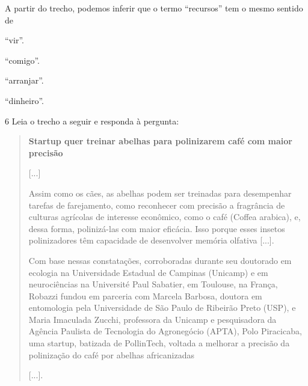 A partir do trecho, podemos inferir que o termo ``recursos'' tem o mesmo
sentido de

\begin{escolha}
\item ``vir''.

\item ``comigo''.

\item ``arranjar''.

\item ``dinheiro''.
\end{escolha}


\num{6} Leia o trecho a seguir e responda à pergunta:

\begin{quote}
\textbf{Startup quer treinar abelhas para polinizarem café com maior precisão}

{[}...{]}

Assim como os cães, as abelhas podem ser treinadas para desempenhar
tarefas de farejamento, como reconhecer com precisão a fragrância de
culturas agrícolas de interesse econômico, como o café (Coffea arabica),
e, dessa forma, polinizá-las com maior eficácia. Isso porque esses
insetos polinizadores têm capacidade de desenvolver memória olfativa
{[}...{]}.

Com base nessas constatações, corroboradas durante seu doutorado em
ecologia na Universidade Estadual de Campinas (Unicamp) e em
neurociências na Université Paul Sabatier, em Toulouse, na França,
Robazzi fundou em parceria com Marcela Barbosa, doutora em entomologia
pela Universidade de São Paulo de Ribeirão Preto (USP), e Maria
Imaculada Zucchi, professora da Unicamp e pesquisadora da Agência
Paulista de Tecnologia do Agronegócio (APTA), Polo Piracicaba, uma
startup, batizada de PollinTech, voltada a melhorar a precisão da
polinização do café por abelhas africanizadas

{[}...{]}.

\end{quote}

